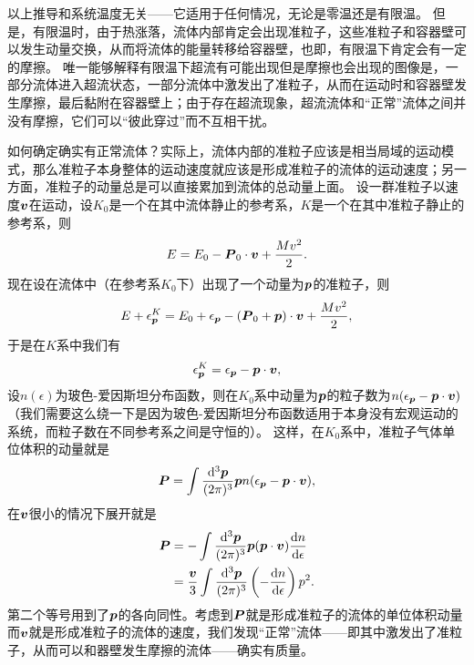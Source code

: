 \documentclass[hyperref, UTF8, a4paper]{ctexart}
\begin{document}
以上推导和系统温度无关——它适用于任何情况，无论是零温还是有限温。
但是，有限温时，由于热涨落，流体内部肯定会出现准粒子，这些准粒子和容器壁可以发生动量交换，从而将流体的能量转移给容器壁，也即，有限温下肯定会有一定的摩擦。
唯一能够解释有限温下超流有可能出现但是摩擦也会出现的图像是，一部分流体进入超流状态，一部分流体中激发出了准粒子，从而在运动时和容器壁发生摩擦，最后黏附在容器壁上；由于存在超流现象，超流流体和“正常”流体之间并没有摩擦，它们可以“彼此穿过”而不互相干扰。

如何确定确实有正常流体？实际上，流体内部的准粒子应该是相当局域的运动模式，那么准粒子本身整体的运动速度就应该是形成准粒子的流体的运动速度；另一方面，准粒子的动量总是可以直接累加到流体的总动量上面。
设一群准粒子以速度$\vb*{v}$在运动，设$K_0$是一个在其中流体静止的参考系，$K$是一个在其中准粒子静止的参考系，则
\[
    E = E_0 - \vb*{P}_0 \cdot \vb*{v} + \frac{M v^2}{2}.
\]
现在设在流体中（在参考系$K_0$下）出现了一个动量为$\vb*{p}$的准粒子，则
\[
    E + \epsilon^K_{\vb*{p}} = E_0 + \epsilon_{\vb*{p}} - (\vb*{P}_0 + \vb*{p}) \cdot \vb*{v} + \frac{M v^2}{2},
\]
于是在$K$系中我们有
\[
    \epsilon^K_{\vb*{p}} = \epsilon_{\vb*{p}} - \vb*{p} \cdot \vb*{v},
\]
设$n(\epsilon)$为玻色-爱因斯坦分布函数，则在$K_0$系中动量为$\vb*{p}$的粒子数为$n(\epsilon_{\vb*{p}} - \vb*{p} \cdot \vb*{v})$（我们需要这么绕一下是因为玻色-爱因斯坦分布函数适用于本身没有宏观运动的系统，而粒子数在不同参考系之间是守恒的）。
这样，在$K_0$系中，准粒子气体单位体积的动量就是
\[
    \vb*{P} = \int \frac{\dd[3]{\vb*{p}}}{(2\pi)^3} \vb*{p} n(\epsilon_{\vb*{p}} - \vb*{p} \cdot \vb*{v}),
\]
在$\vb*{v}$很小的情况下展开就是
\[
    \begin{aligned}
        \vb*{P} &= - \int \frac{\dd[3]{\vb*{p}}}{(2\pi)^3} \vb*{p} (\vb*{p} \cdot \vb*{v}) \dv{n}{\epsilon} \\
        &= \frac{\vb*{v}}{3} \int \frac{\dd[3]{\vb*{p}}}{(2\pi)^3} \left( - \dv{n}{\epsilon} \right) p^2.
    \end{aligned}
\]
第二个等号用到了$\vb*{p}$的各向同性。考虑到$\vb*{P}$就是形成准粒子的流体的单位体积动量而$\vb*{v}$就是形成准粒子的流体的速度，我们发现“正常”流体——即其中激发出了准粒子，从而可以和器壁发生摩擦的流体——确实有质量。
\end{document}
